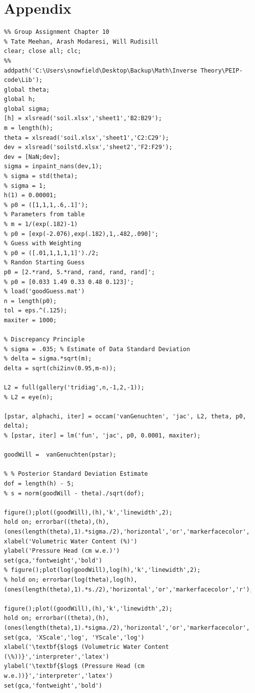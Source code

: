 \documentclass{article}
\begin{document}



\section*{Appendix}

\begin{verbatim}
%% Group Assignment Chapter 10
% Tate Meehan, Arash Modaresi, Will Rudisill
clear; close all; clc;
%% 
addpath('C:\Users\snowfield\Desktop\Backup\Math\Inverse Theory\PEIP-code\Lib');
global theta;
global h;
global sigma;
[h] = xlsread('soil.xlsx','sheet1','B2:B29');
m = length(h);
theta = xlsread('soil.xlsx','sheet1','C2:C29');
dev = xlsread('soilstd.xlsx','sheet2','F2:F29');
dev = [NaN;dev];
sigma = inpaint_nans(dev,1);
% sigma = std(theta);
% sigma = 1;
h(1) = 0.00001;
% p0 = ([1,1,1,.6,.1]');
% Parameters from table
% m = 1/(exp(.182)-1)
% p0 = [exp(-2.076),exp(.182),1,.482,.090]';
% Guess with Weighting
% p0 = ([.01,1,1,1,1]')./2;
% Randon Starting Guess
p0 = [2.*rand, 5.*rand, rand, rand, rand]';
% p0 = [0.033 1.49 0.33 0.48 0.123]';
% load('goodGuess.mat')
n = length(p0);
tol = eps.^(.125);
maxiter = 1000;

% Discrepancy Principle
% sigma = .035; % Estimate of Data Standard Deviation
% delta = sigma.*sqrt(m);
delta = sqrt(chi2inv(0.95,m-n));

L2 = full(gallery('tridiag',n,-1,2,-1));
% L2 = eye(n);

[pstar, alphachi, iter] = occam('vanGenuchten', 'jac', L2, theta, p0, delta);
% [pstar, iter] = lm('fun', 'jac', p0, 0.0001, maxiter);

goodWill =  vanGenuchten(pstar);

% % Posterior Standard Deviation Estimate
dof = length(h) - 5;
% s = norm(goodWill - theta)./sqrt(dof);

figure();plot((goodWill),(h),'k','linewidth',2);
hold on; errorbar((theta),(h),(ones(length(theta),1).*sigma./2),'horizontal','or','markerfacecolor','r','markersize',5);
xlabel('Volumetric Water Content (%)')
ylabel('Pressure Head (cm w.e.)')
set(gca,'fontweight','bold')
% figure();plot(log(goodWill),log(h),'k','linewidth',2);
% hold on; errorbar(log(theta),log(h),(ones(length(theta),1).*s./2),'horizontal','or','markerfacecolor','r');

figure();plot((goodWill),(h),'k','linewidth',2);
hold on; errorbar((theta),(h),(ones(length(theta),1).*sigma./2),'horizontal','or','markerfacecolor','r','markersize',5);
set(gca, 'XScale','log', 'YScale','log')
xlabel('\textbf{$log$ (Volumetric Water Content (\%))}','interpreter','latex')
ylabel('\textbf{$log$ (Pressure Head (cm w.e.))}','interpreter','latex')
set(gca,'fontweight','bold')


\end{verbatim}
\end{document}
